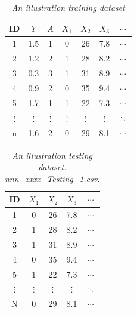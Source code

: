 \documentclass[12pt]{article}
\begin{document}




\newpage

\begin{table}[htbp]
  \centering
  \caption{\emph{An illustration training dataset}}
    \begin{tabular}{c|c|c|cccc}
    \hline
    \hline
    ID & $Y$     & $A$   & $X_1$    & $X_2$    & $X_3$    & $\cdots$ \\
    \hline
    1&1.5  & 1     & 0     & 26    & 7.8   & $\cdots$ \\
    2&1.2  & 2     & 1     & 28    & 8.2   & $\cdots$  \\
    3&0.3  & 3     & 1     & 31    & 8.9   & $\cdots$  \\
    4&0.9  & 2     & 0     & 35    & 9.4   & $\cdots$  \\
    5&1.7  & 1     & 1     & 22    & 7.3   & $\cdots$  \\
    $\vdots$ & $\vdots$    & $\vdots$    & $\vdots$   & $\vdots$     & $\vdots$     & $\ddots$  \\
    n & 1.6 & 2 & 0 & 29 & 8.1 & $\cdots$ \\
    \hline
    \hline
    \end{tabular}%
  \label{tab:TrainingDataExample}%
\end{table}%

\begin{table}[htbp]
  \centering
  \caption{\emph{An illustration testing dataset: nnn\_xxxx\_Testing\_1.csv.} }
    \begin{tabular}{c|cccc}
    \hline
    \hline
    ID &  $X_1$    & $X_2$    & $X_3$    & $\cdots$ \\
    \hline
    1& 0     & 26    & 7.8   & $\cdots$ \\
    2& 1     & 28    & 8.2   & $\cdots$  \\
    3& 1     & 31    & 8.9   & $\cdots$  \\
    4& 0     & 35    & 9.4   & $\cdots$  \\
    5& 1     & 22    & 7.3   & $\cdots$  \\
    $\vdots$ &  $\vdots$   & $\vdots$     & $\vdots$     & $\ddots$  \\
    N &  0 & 29 & 8.1 & $\cdots$ \\
    \hline
    \hline
    \end{tabular}%
  \label{tab:TestingDataExample1}%
\end{table}
\end{document}
